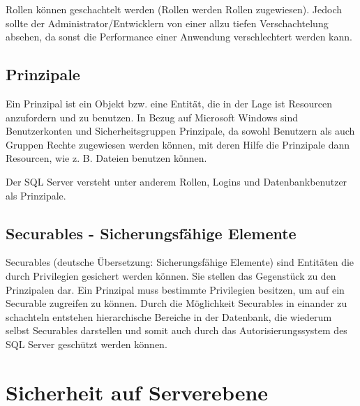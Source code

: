         \begin{merke}
          Rollen können geschachtelt werden (Rollen werden Rollen zugewiesen).
          Jedoch sollte der Administrator/Entwicklern von einer allzu tiefen
          Verschachtelung absehen, da sonst die Performance einer Anwendung
          verschlechtert werden kann.
        \end{merke}
        \begin{literaturinternet}
          \item \cite{bb669084}
        \end{literaturinternet}
      \subsection{Prinzipale}
        Ein Prinzipal ist ein Objekt bzw. eine Entität, die in der Lage ist
        Resourcen anzufordern und zu benutzen. In Bezug auf Microsoft Windows
        sind Benutzerkonten und Sicherheitsgruppen Prinzipale, da sowohl
        Benutzern als auch Gruppen Rechte zugewiesen werden können, mit deren
        Hilfe die Prinzipale dann Resourcen, wie z. B. Dateien benutzen
        können.
        
        Der SQL Server versteht unter anderem Rollen, Logins und
        Datenbankbenutzer als Prinzipale.
        \begin{literaturinternet}
          \item \cite{ms181127}
        \end{literaturinternet}
      \subsection{Securables - Sicherungsfähige Elemente}
        Securables (deutsche Übersetzung: Sicherungsfähige Elemente) sind
        Entitäten die durch Privilegien gesichert werden können. Sie stellen
        das Gegenstück zu den Prinzipalen dar. Ein Prinzipal muss bestimmte
        Privilegien besitzen, um auf ein Securable zugreifen zu können. Durch
        die Möglichkeit Securables in einander zu schachteln entstehen
        hierarchische Bereiche in der Datenbank, die wiederum selbst
        Securables darstellen und somit auch durch das Autorisierungssystem
        des SQL Server geschützt werden können.
        \begin{literaturinternet}
          \item \cite{ms190401}
        \end{literaturinternet}
    \section{Sicherheit auf Serverebene}
